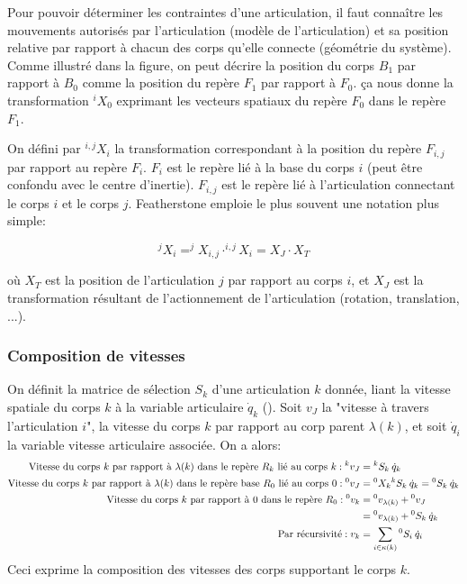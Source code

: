\documentclass{report}
\begin{document}
Pour pouvoir déterminer les contraintes d'une articulation, il faut connaître les mouvements autorisés par l'articulation (modèle de l'articulation) et sa position relative par rapport à chacun des corps qu'elle connecte (géométrie du système). Comme illustré dans la figure, on peut décrire la position du corps $B_1$ par rapport à $B_0$ comme la position du repère $F_1$ par rapport à $F_0$. ça nous donne la transformation $^iX_0$ exprimant les vecteurs spatiaux du repère $F_0$ dans le repère $F_1$.

On défini par $^{i,j}X_i$ la transformation correspondant à la position du repère $F_{i,j}$ par rapport au repère $F_i$. $F_i$ est le repère lié à la base du corps $i$ (peut être confondu avec le centre d'inertie). $F_{i,j}$ est le repère lié à l'articulation connectant le corps $i$ et le corps $j$. Featherstone emploie le plus souvent une notation plus simple:

\begin{equation*}
^jX_i = ^jX_{i,j} \cdot ^{i,j}X_i = X_J \cdot X_T
\end{equation*}

où $X_T$ est la position de l'articulation $j$ par rapport au corps $i$, et $X_J$ est la transformation résultant de l'actionnement de l'articulation (rotation, translation, ...).



\subsubsection*{Composition de vitesses}
On définit la matrice de sélection $S_k$ d'une articulation $k$ donnée, liant la vitesse spatiale du corps $k$ à la variable articulaire $\dot{q}_k$ (\cite[section 3.5]{bib_featherstone}). Soit $v_J$ la "vitesse à travers l'articulation $i$", \cad la vitesse du corps $k$ par rapport au corp parent $\lambda(k)$, et soit $\dot{q}_i$ la variable vitesse articulaire associée. On a alors:
\begin{align}
\textnormal{Vitesse du corps $k$ par rapport à $\lambda(k)$ dans le repère $R_k$ lié au corps $k$} : {^kv_J} &= {^kS_k} \: \dot{q}_k \\
\textnormal{Vitesse du corps $k$ par rapport à $\lambda(k)$ dans le repère base $R_0$ lié au corps $0$} : {^0v_J} &= {^0X_k} {^kS_k} \: \dot{q}_k = {^0S_k} \: \dot{q}_k \\
\textnormal{Vitesse du corps $k$ par rapport à $0$ dans le repère $R_0$} : {^0v_k} &= {^0v_{\lambda(k)}} + {^0v_{J}} \\
&= {^0v_{\lambda(k)}} + {^0S_k} \: \dot{q}_k \\
\textnormal{Par récursivité} : v_k &= \sum_{i \in \kappa(k)} {^0S_i} \: \dot{q}_i
\end{align}
Ceci exprime la composition des vitesses des corps supportant le corps $k$.
\end{document}

